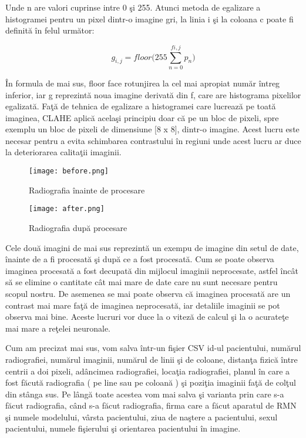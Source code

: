 Unde n are valori cuprinse intre 0 \c{s}i 255. Atunci metoda de egalizare a histogramei pentru un pixel dintr-o imagine gri, la linia i \c{s}i la coloana c poate fi definit\u{a} \^{i}n felul urm\u{a}tor:

$$g_{i,j} = floor\bigg( 255 \sum_{n=0}^{f{i,j}} p_n \bigg)$$

\^{I}n formula de mai sus, floor face rotunjirea la cel mai apropiat num\u{a}r \^{i}ntreg inferior, iar g reprezint\u{a} noua imagine derivat\u{a} din f, care are histograma pixelilor egalizat\u{a}. Fa\c{t}\u{a} de tehnica de egalizare a histogramei care lucreaz\u{a} pe toat\u{a} imaginea, CLAHE aplic\u{a} acela\c{s}i principiu doar c\u{a} pe un bloc de pixeli, spre exemplu un bloc de pixeli de dimensiune [8 x 8], dintr-o imagine. Acest lucru este necesar pentru a evita schimbarea contrastului \^{i}n regiuni unde acest lucru ar duce la deteriorarea calita\c{t}ii imaginii.

\begin{figure}[h!]
  \center
  \texttt{[image: before.png]}
  \caption{Radiografia \^{i}nainte de procesare}
\end{figure}

\begin{figure}[h!]
  \center
  \texttt{[image: after.png]}
  \caption{Radiografia dup\u{a} procesare}
\end{figure}

Cele dou\u{a} imagini de mai sus reprezint\u{a} un exempu de imagine din setul de date, \^{i}nainte de a fi procesat\u{a} \c{s}i dup\u{a} ce a fost procesat\u{a}. Cum se poate observa imaginea procesat\u{a} a fost decupat\u{a} din mijlocul imaginii neprocesate, astfel \^{i}nc\^{a}t s\u{a} se elimine o cantitate c\^{a}t mai mare de date care nu sunt necesare pentru scopul nostru. De asemenea se mai poate observa c\u{a} imaginea procesat\u{a} are un contrast mai mare fa\c{t}\u{a} de imaginea neprocesat\u{a}, iar detaliile imaginii se pot observa mai bine. Aceste lucruri vor duce la o vitez\u{a} de calcul \c{s}i la o acurate\c{t}e mai mare a re\c{t}elei neuronale.

\par

Cum am precizat mai sus, vom salva \^{i}ntr-un fi\c{s}ier CSV id-ul pacientului, num\u{a}rul radiografiei, num\u{a}rul imaginii, num\u{a}rul de linii \c{s}i de coloane, distan\c{t}a fizic\u{a} \^{i}ntre centrii a doi pixeli, ad\^{a}ncimea radiografiei, loca\c{t}ia radiografiei, planul \^{i}n care a fost f\u{a}cut\u{a} radiografia ( pe line sau pe coloan\u{a} ) \c{s}i pozi\c{t}ia imaginii fa\c{t}\u{a} de col\c{t}ul din st\^{a}nga sus. Pe l\^{a}ng\u{a} toate acestea vom mai salva \c{s}i varianta prin care s-a f\u{a}cut radiografia, c\^{a}nd s-a f\u{a}cut radiografia, firma care a f\u{a}cut aparatul de RMN \c{s}i numele modelului, v\^{a}rsta pacientului, ziua de na\c{s}tere a pacientului, sexul pacientului, numele fi\c{s}ierului \c{s}i orientarea pacientului \^{i}n imagine. 

